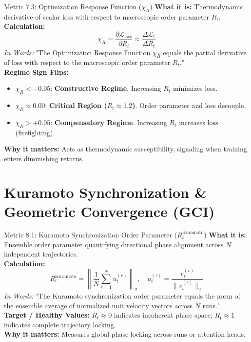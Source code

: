 \documentclass[10pt,a4paper]{article}
\begin{document}
\begin{metricbox}{Metric 7.3: Optimization Response Function ($\chi_R$)}
\textbf{What it is:} Thermodynamic derivative of scalar loss with respect to macroscopic order parameter $R_t$.\\
\textbf{Calculation:}
$$\chi_R = \frac{\partial \mathcal{L}_{\text{loss}}}{\partial R_t} \approx \frac{\Delta \mathcal{L}_t}{\Delta R_t}$$
\emph{In Words:} "The Optimization Response Function $\chi_R$ equals the partial derivative of loss with respect to the macroscopic order parameter $R_t$."\\
\textbf{Regime Sign Flips:}
\begin{itemize}
    \item $\chi_R < -0.05$: \textbf{Constructive Regime}. Increasing $R_t$ minimizes loss.
    \item $\chi_R \approx 0.00$: \textbf{Critical Region ($R_t \approx 1.2$)}. Order parameter and loss decouple.
    \item $\chi_R > +0.05$: \textbf{Compensatory Regime}. Increasing $R_t$ increases loss (firefighting).
\end{itemize}
\textbf{Why it matters:} Acts as thermodynamic susceptibility, signaling when training enters diminishing returns.
\end{metricbox}

\section{Kuramoto Synchronization \& Geometric Convergence (GCI)}

\begin{metricbox}{Metric 8.1: Kuramoto Synchronization Order Parameter ($R_t^{\text{Kuramoto}}$)}
\textbf{What it is:} Ensemble order parameter quantifying directional phase alignment across $N$ independent trajectories.\\
\textbf{Calculation:}
$$R_t^{\text{Kuramoto}} = \left\| \frac{1}{N} \sum_{r=1}^N u_t^{(r)} \right\|_2, \quad u_t^{(r)} = \frac{v_t^{(r)}}{\|v_t^{(r)}\|_2}$$
\emph{In Words:} "The Kuramoto synchronization order parameter equals the norm of the ensemble average of normalized unit velocity vectors across $N$ runs."\\
\textbf{Target / Healthy Values:} $R_t \approx 0$ indicates incoherent phase space; $R_t \approx 1$ indicates complete trajectory locking.\\
\textbf{Why it matters:} Measures global phase-locking across runs or attention heads.
\end{metricbox}
\end{document}
